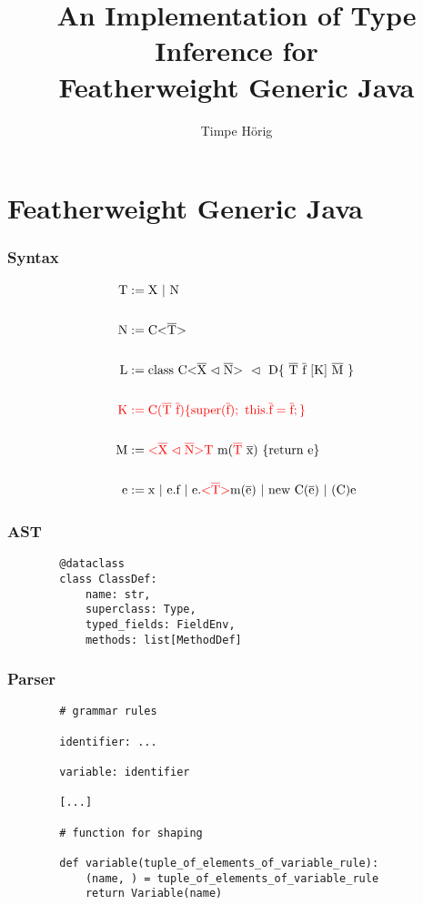 \documentclass[aspectratio=169]{beamer}
\title[Type Inference for FGJ]{An Implementation of Type Inference for\\Featherweight Generic Java}
\institute[Uni Freiburg]{Chair of Programming Languages, University of Freiburg}
\author{Timpe Hörig}
\begin{document}
\begin{frame}
    \titlepage
\end{frame}

\section{Featherweight Generic Java}

\begin{frame}[fragile]
    \frametitle{Syntax}
    \begin{align*}
        \text{T} &:= \text{X} \ | \ \text{N}\\
        \\
        \text{N} &:= \text{C} \vv{\ot{T}}\\
        \\
        \text{L} &:= \text{class} \ \text{C} \xn \ \vartriangleleft \ \text{D} \{ \ \ot{T} \ \ot{f} \ [\text{K}] \ \ot{M} \ \}\\
        \\
        \color{red}\text{K} &\color{red}:= \text{C}(\ot{T} \ \ot{f})\{ \text{super}(\ot{f}); \ \text{this}. \ot{f} = \ot{f}; \} \\
        \\
        \text{M} &:= \color{red} \xn \text{T} \ \color{black} \text{m}(\color{red} \ot{T} \ \color{black} \ot{x}) \ \{\text{return e}\}\\
        \\
        \text{e} &:= \text{x} \ | \ \text{e.f} \ | \ \text{e.} \color{red} \text{<} \ot{T} \text{>} \color{black} \text{m(}\ot{e}\text{)} \ | \ \text{new C(}\ot{e}\text{)} \ | \ \text{(C)e}
    \end{align*}
\end{frame}

\begin{frame}[fragile]
    \frametitle{AST}
    \begin{verbatim}
        @dataclass
        class ClassDef:
            name: str,
            superclass: Type,
            typed_fields: FieldEnv,
            methods: list[MethodDef]
    \end{verbatim}
\end{frame}

\begin{frame}[fragile]
    \frametitle{Parser}
    \begin{verbatim}
        # grammar rules
    
        identifier: ...
    
        variable: identifier
    
        [...]
    
        # function for shaping
    
        def variable(tuple_of_elements_of_variable_rule):
            (name, ) = tuple_of_elements_of_variable_rule
            return Variable(name)
    \end{verbatim}
\end{frame}
\end{document}
